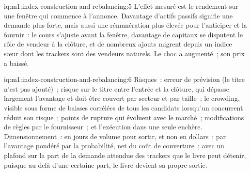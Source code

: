 \begin{solution}{iq:m1:index-construction-and-rebalancing:5}
L'effet mesuré est le rendement sur une fenêtre qui commence à
l'annonce. Davantage d'actifs passifs signifie une demande plus forte, mais aussi une
rémunération plus élevée pour l'anticiper et la fournir~: le cours s'ajuste avant la
fenêtre, davantage de capitaux se disputent le rôle de vendeur à la clôture, et de nombreux ajouts
migrent depuis un indice sœur dont les trackers sont des vendeurs naturels. Le choc
a augmenté~; son prix a baissé.
\end{solution}

\begin{solution}{iq:m1:index-construction-and-rebalancing:6}
Risques~: erreur de prévision (le titre n'est pas ajouté)~; risque sur le titre entre l'entrée et
la clôture, qui dépasse largement l'avantage et doit être couvert par secteur et par taille~;
le crowding, visible sous forme de baisses corrélées de tous les candidats lorsqu'un
concurrent réduit son risque~; points de rupture qui évoluent avec le marché~; modifications de règles par le
fournisseur~; et l'exécution dans une seule enchère. Dimensionnement~: en jours de volume
pour sortir, et non en dollars~; par l'avantage pondéré par la probabilité, net du coût de couverture~; avec un
plafond sur la part de la demande attendue des trackers que le livre peut détenir, puisque
au-delà d'une certaine part, le livre devient sa propre sortie.
\end{solution}
